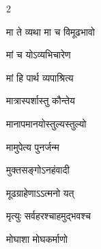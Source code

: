 \begin{multicols}{2}
\begin{indexlist}
\item मा ते व्यथा मा च विमूढभावो \dotfill {}
\item मां च योऽव्यभिचारेण \dotfill {}
\item मां हि पार्थ व्यपाश्रित्य \dotfill {}
\item मात्रास्पर्शास्तु कौन्तेय \dotfill {}
\item मानापमानयोस्तुल्यस्तुल्यो \dotfill {}
\item मामुपेत्य पुनर्जन्म \dotfill {}
\item मुक्तसङ्गोऽनहंवादी \dotfill {}
\item मूढग्राहेणाऽऽत्मनो यत् \dotfill {}
\item मृत्युः सर्वहरश्चाहमुद्भवश्च \dotfill {}
\item मोघाशा मोघकर्माणो \dotfill {}
\end{indexlist}


\end{multicols}
